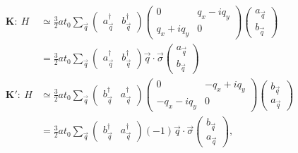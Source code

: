 \begin{align*}
	\bm{K:} \ H&\simeq\frac{3}{2} a t_0 \sum_{\vec q} 
		\left( \begin{array}{cc} a^{\dagger}_{\vec{q}} & b^{\dagger}_{\vec{q}} \end{array} \right)
		\left( \begin{array}{cc}
			0              & q_x - i q_y\\
			q_x+i q_y      & 0                                                 \end{array} \right)
		\left( \begin{array}{c } a_{\vec{q}}           \\ b_{\vec{q}}          \end{array} \right) \\
	  &=\frac{3}{2} a t_0 \sum_{\vec q}
		\left( \begin{array}{cc} a^{\dagger}_{\vec{q}} & b^{\dagger}_{\vec{q}} \end{array} \right)
		\vec{q} \cdot \vec{\sigma}
		\left( \begin{array}{c } a_{\vec{q}}           \\ b_{\vec{q}}          \end{array} \right) \\
	\bm{K':} \ H& \simeq \frac{3}{2} a t_0 \sum_{\vec q} 
		\left( \begin{array}{cc} b^{\dagger}_{\vec{q}} & a^{\dagger}_{\vec{q}} \end{array} \right)
		\left( \begin{array}{cc}
			0              & -q_x + i q_y\\
			-q_x-i q_y     & 0                                                 \end{array} \right)
		\left( \begin{array}{c } b_{\vec{q}}           \\ a_{\vec{q}}          \end{array} \right) \\
	  &=\frac{3}{2} a t_0 \sum_{\vec q}
		\left( \begin{array}{cc} b^{\dagger}_{\vec{q}} & a^{\dagger}_{\vec{q}} \end{array} \right)
		(-1)\vec{q} \cdot \vec{\sigma}
		\left( \begin{array}{c } b_{\vec{q}}           \\ a_{\vec{q}}          \end{array} \right), \\
\end{align*}
